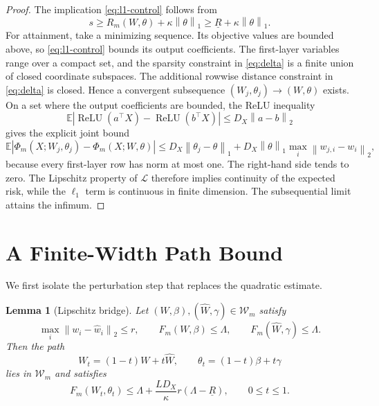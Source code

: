 \documentclass[pdflatex,sn-mathphys-num]{sn-jnl}
\theoremstyle{thmstyleone}
\newtheorem{lemma}[theorem]{Lemma}
\theoremstyle{thmstyletwo}
\theoremstyle{thmstylethree}
\newcommand{\relu}{\operatorname{ReLU}}
\newcommand{\E}{\mathbb{E}}
\newcommand{\norm}[1]{\left\lVert #1 \right\rVert}
\newcommand{\abs}[1]{\left\lvert #1 \right\rvert}
\begin{document}
\begin{proof}
The implication \eqref{eq:l1-control} follows from
\[
s\ge R_m(W,\theta)+\kappa\norm{\theta}_1
\ge\underline R+\kappa\norm{\theta}_1.
\]
For attainment, take a minimizing sequence. Its objective values are bounded above, so \eqref{eq:l1-control} bounds its output coefficients. The first-layer variables range over a compact set, and the sparsity constraint in \eqref{eq:delta} is a finite union of closed coordinate subspaces. The additional rowwise distance constraint in \eqref{eq:delta} is closed. Hence a convergent subsequence $(W_j,\theta_j)\to(W,\theta)$ exists. On a set where the output coefficients are bounded, the ReLU inequality
\[
\E\abs{\relu(a^\top X)-\relu(b^\top X)}
\le D_X\norm{a-b}_2
\label{eq:relu-lipschitz}
\]
gives the explicit joint bound
\[
\E\abs{\Phi_m(X;W_j,\theta_j)-\Phi_m(X;W,\theta)}
\le D_X\norm{\theta_j-\theta}_1
   +D_X\norm{\theta}_1\max_i\norm{w_{j,i}-w_i}_2,
\]
because every first-layer row has norm at most one. The right-hand side tends to zero. The Lipschitz property of $\mathcal L$ therefore implies continuity of the expected risk, while the $\ell_1$ term is continuous in finite dimension. The subsequential limit attains the infimum.
\end{proof}

\section{A Finite-Width Path Bound}\label{sec:finite}

We first isolate the perturbation step that replaces the quadratic estimate.

\begin{lemma}[Lipschitz bridge]\label{lem:bridge}
Let $(W,\beta),(\widehat W,\gamma)\in\mathcal W_m$ satisfy
\[
\max_i\norm{w_i-\hat w_i}_2\le r,
\qquad
F_m(W,\beta)\le\Lambda,
\qquad
F_m(\widehat W,\gamma)\le\Lambda.
\]
Then the path
\[
W_t=(1-t)W+t\widehat W,
\qquad
\theta_t=(1-t)\beta+t\gamma
\]
lies in $\mathcal W_m$ and satisfies
\begin{equation}
F_m(W_t,\theta_t)
\le
\Lambda+\frac{LD_X}{\kappa}r(\Lambda-\underline R),
\qquad 0\le t\le1.
\label{eq:bridge-bound}
\end{equation}
\end{lemma}
\end{document}
